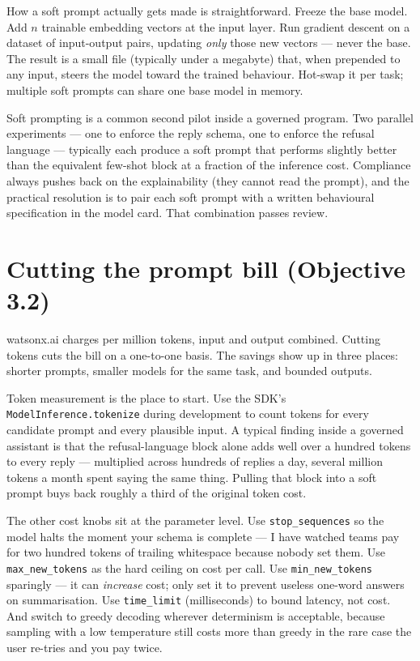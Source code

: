 How a soft prompt actually gets made is straightforward. Freeze the base model. Add $n$ trainable embedding vectors at the input layer. Run gradient descent on a dataset of input-output pairs, updating \emph{only} those new vectors --- never the base. The result is a small file (typically under a megabyte) that, when prepended to any input, steers the model toward the trained behaviour. Hot-swap it per task; multiple soft prompts can share one base model in memory.

Soft prompting is a common second pilot inside a governed program. Two parallel experiments --- one to enforce the reply schema, one to enforce the refusal language --- typically each produce a soft prompt that performs slightly better than the equivalent few-shot block at a fraction of the inference cost. Compliance always pushes back on the explainability (they cannot read the prompt), and the practical resolution is to pair each soft prompt with a written behavioural specification in the model card. That combination passes review.


\section{Cutting the prompt bill (Objective 3.2)}

watsonx.ai charges per million tokens, input and output combined. Cutting tokens cuts the bill on a one-to-one basis. The savings show up in three places: shorter prompts, smaller models for the same task, and bounded outputs.

Token measurement is the place to start. Use the SDK's \texttt{ModelInference.tokenize} during development to count tokens for every candidate prompt and every plausible input. A typical finding inside a governed assistant is that the refusal-language block alone adds well over a hundred tokens to every reply --- multiplied across hundreds of replies a day, several million tokens a month spent saying the same thing. Pulling that block into a soft prompt buys back roughly a third of the original token cost.

The other cost knobs sit at the parameter level. Use \texttt{stop\_sequences} so the model halts the moment your schema is complete --- I have watched teams pay for two hundred tokens of trailing whitespace because nobody set them. Use \texttt{max\_new\_tokens} as the hard ceiling on cost per call. Use \texttt{min\_new\_tokens} sparingly --- it can \emph{increase} cost; only set it to prevent useless one-word answers on summarisation. Use \texttt{time\_limit} (milliseconds) to bound latency, not cost. And switch to greedy decoding wherever determinism is acceptable, because sampling with a low temperature still costs more than greedy in the rare case the user re-tries and you pay twice.

